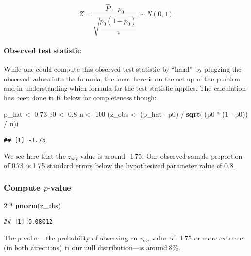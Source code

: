 \documentclass[]{tufte-book}
\newenvironment{Shaded}{\begin{snugshade}}{\end{snugshade}}
\newcommand{\KeywordTok}[1]{\textcolor[rgb]{0.13,0.29,0.53}{\textbf{{#1}}}}
\newcommand{\DecValTok}[1]{\textcolor[rgb]{0.00,0.00,0.81}{{#1}}}
\newcommand{\FloatTok}[1]{\textcolor[rgb]{0.00,0.00,0.81}{{#1}}}
\newcommand{\StringTok}[1]{\textcolor[rgb]{0.31,0.60,0.02}{{#1}}}
\newcommand{\NormalTok}[1]{{#1}}
\begin{document}
\[ Z =\dfrac{ \hat{P} - p_0}{\sqrt{\dfrac{p_0(1 - p_0)}{n} }} \sim N(0, 1) \]

\paragraph{Observed test statistic}\label{observed-test-statistic-1}

While one could compute this observed test statistic by ``hand'' by
plugging the observed values into the formula, the focus here is on the
set-up of the problem and in understanding which formula for the test
statistic applies. The calculation has been done in R below for
completeness though:

\begin{Shaded}
\begin{Highlighting}[]
\NormalTok{p_hat <-}\StringTok{ }\FloatTok{0.73}
\NormalTok{p0 <-}\StringTok{ }\FloatTok{0.8}
\NormalTok{n <-}\StringTok{ }\DecValTok{100}
\NormalTok{(z_obs <-}\StringTok{ }\NormalTok{(p_hat -}\StringTok{ }\NormalTok{p0) /}\StringTok{ }\KeywordTok{sqrt}\NormalTok{( (p0 *}\StringTok{ }\NormalTok{(}\DecValTok{1} \NormalTok{-}\StringTok{ }\NormalTok{p0)) /}\StringTok{ }\NormalTok{n))}
\end{Highlighting}
\end{Shaded}

\begin{verbatim}
## [1] -1.75
\end{verbatim}

We see here that the \(z_{obs}\) value is around -1.75. Our observed
sample proportion of 0.73 is 1.75 standard errors below the hypothesized
parameter value of 0.8.

\subsubsection{\texorpdfstring{Compute
\(p\)-value}{Compute p-value}}\label{compute-p-value-1}

\begin{Shaded}
\begin{Highlighting}[]
\DecValTok{2} \NormalTok{*}\StringTok{ }\KeywordTok{pnorm}\NormalTok{(z_obs)}
\end{Highlighting}
\end{Shaded}

\begin{verbatim}
## [1] 0.08012
\end{verbatim}

The \(p\)-value---the probability of observing an \(z_{obs}\) value of
-1.75 or more extreme (in both directions) in our null distribution---is
around 8\%.
\end{document}

